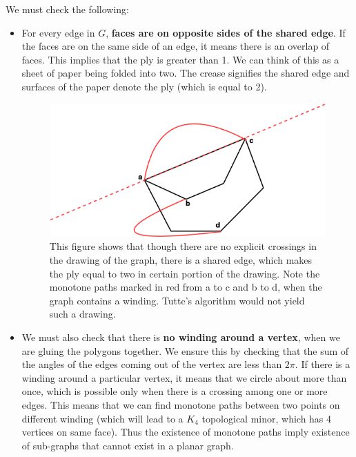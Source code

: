 \documentclass{article}
\begin{document}
    \medskip \noindent We must check the following:
    \begin{itemize}
        \item For every edge in $G$, \textbf{faces are on opposite sides of the shared edge}. If the faces are on the same side of an edge, it means there is an overlap of faces. This implies that the ply is greater than 1. We can think of this as a sheet of paper being folded into two. The crease signifies the shared edge and surfaces of the paper denote the ply (which is equal to 2).
        
        \begin{figure}[H]
        \centering
        \includegraphics[scale=0.5]{Images/shared_edge_ply.png}
        \caption{This figure shows that though there are no explicit crossings in the drawing of the graph, there is a shared edge, which makes the ply equal to two in certain portion of the drawing. Note the monotone paths marked in red from a to c and b to d, when the graph contains a winding. Tutte's algorithm would not yield such a drawing.}
        \label{fig:my_label}
        \end{figure}
    
    
        \item We must also check that there is \textbf{no winding around a vertex}, when we are gluing the polygons together. We ensure this by checking that the sum of the angles of the edges coming out of the vertex are less than $2 \pi$. If there is a winding around a particular vertex, it means that we circle about more than once, which is possible only when there is a crossing among one or more edges. This means that we can find monotone paths between two points on different winding (which will lead to a $K_4$ topological minor, which has 4 vertices on same face). Thus the existence of monotone paths imply existence of sub-graphs that cannot exist in a planar graph.
        

\end{itemize}
\end{document}
